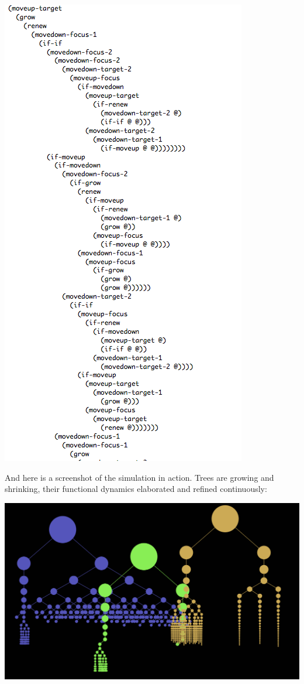 \documentclass[12pt]{article}
\begin{document}
\begin{center}
\includegraphics[scale=0.6]{treecode.png}
\end{center}

And here is a screenshot of the simulation in action.  Trees are growing and shrinking, their functional dynamics elaborated and refined continuously:

\begin{center}
\includegraphics[scale=0.4]{treegrowth.png}
\end{center}
\end{document}
